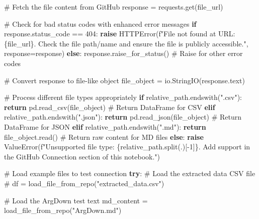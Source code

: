 \documentclass[
  11pt,
  letterpaper,
]{book}
\newenvironment{Shaded}{\begin{snugshade}}{\end{snugshade}}
\newcommand{\CommentTok}[1]{\textcolor[rgb]{0.37,0.37,0.37}{#1}}
\newcommand{\ControlFlowTok}[1]{\textcolor[rgb]{0.00,0.23,0.31}{\textbf{#1}}}
\newcommand{\DecValTok}[1]{\textcolor[rgb]{0.68,0.00,0.00}{#1}}
\newcommand{\NormalTok}[1]{\textcolor[rgb]{0.00,0.23,0.31}{#1}}
\newcommand{\OperatorTok}[1]{\textcolor[rgb]{0.37,0.37,0.37}{#1}}
\newcommand{\PreprocessorTok}[1]{\textcolor[rgb]{0.68,0.00,0.00}{#1}}
\newcommand{\SpecialCharTok}[1]{\textcolor[rgb]{0.37,0.37,0.37}{#1}}
\newcommand{\SpecialStringTok}[1]{\textcolor[rgb]{0.13,0.47,0.30}{#1}}
\newcommand{\StringTok}[1]{\textcolor[rgb]{0.13,0.47,0.30}{#1}}
\begin{document}
\begin{Shaded}
\begin{Highlighting}[]
    \CommentTok{\# Fetch the file content from GitHub}
\NormalTok{    response }\OperatorTok{=}\NormalTok{ requests.get(file\_url)}

    \CommentTok{\# Check for bad status codes with enhanced error messages}
    \ControlFlowTok{if}\NormalTok{ response.status\_code }\OperatorTok{==} \DecValTok{404}\NormalTok{:}
        \ControlFlowTok{raise}\NormalTok{ HTTPError(}\SpecialStringTok{f"File not found at URL: }\SpecialCharTok{\{}\NormalTok{file\_url}\SpecialCharTok{\}}\SpecialStringTok{. Check the file path/name and ensure the file is publicly accessible."}\NormalTok{, response}\OperatorTok{=}\NormalTok{response)}
    \ControlFlowTok{else}\NormalTok{:}
\NormalTok{        response.raise\_for\_status()  }\CommentTok{\# Raise for other error codes}

    \CommentTok{\# Convert response to file{-}like object}
\NormalTok{    file\_object }\OperatorTok{=}\NormalTok{ io.StringIO(response.text)}

    \CommentTok{\# Process different file types appropriately}
    \ControlFlowTok{if}\NormalTok{ relative\_path.endswith(}\StringTok{".csv"}\NormalTok{):}
        \ControlFlowTok{return}\NormalTok{ pd.read\_csv(file\_object)  }\CommentTok{\# Return DataFrame for CSV}
    \ControlFlowTok{elif}\NormalTok{ relative\_path.endswith(}\StringTok{".json"}\NormalTok{):}
        \ControlFlowTok{return}\NormalTok{ pd.read\_json(file\_object)  }\CommentTok{\# Return DataFrame for JSON}
    \ControlFlowTok{elif}\NormalTok{ relative\_path.endswith(}\StringTok{".md"}\NormalTok{):}
        \ControlFlowTok{return}\NormalTok{ file\_object.read()  }\CommentTok{\# Return raw content for MD files}
    \ControlFlowTok{else}\NormalTok{:}
        \ControlFlowTok{raise} \PreprocessorTok{ValueError}\NormalTok{(}\SpecialStringTok{f"Unsupported file type: }\SpecialCharTok{\{}\NormalTok{relative\_path}\SpecialCharTok{.}\NormalTok{split(}\StringTok{\textquotesingle{}.\textquotesingle{}}\NormalTok{)[}\OperatorTok{{-}}\DecValTok{1}\NormalTok{]}\SpecialCharTok{\}}\SpecialStringTok{. Add support in the GitHub Connection section of this notebook."}\NormalTok{)}

\CommentTok{\# Load example files to test connection}
\ControlFlowTok{try}\NormalTok{:}
    \CommentTok{\# Load the extracted data CSV file}
\CommentTok{\#    df = load\_file\_from\_repo("extracted\_data.csv")}

    \CommentTok{\# Load the ArgDown test text}
\NormalTok{    md\_content }\OperatorTok{=}\NormalTok{ load\_file\_from\_repo(}\StringTok{"ArgDown.md"}\NormalTok{)}


\end{Highlighting}
\end{Shaded}
\end{document}
